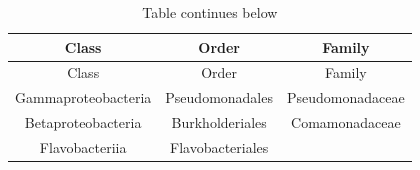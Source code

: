 \documentclass[]{article}
\begin{document}
\begin{longtable}[]{@{}ccc@{}}
\caption{Table continues below}\tabularnewline
\toprule
\begin{minipage}[b]{0.28\columnwidth}\centering\strut
Class\strut
\end{minipage} & \begin{minipage}[b]{0.25\columnwidth}\centering\strut
Order\strut
\end{minipage} & \begin{minipage}[b]{0.25\columnwidth}\centering\strut
Family\strut
\end{minipage}\tabularnewline
\midrule
\endfirsthead
\toprule
\begin{minipage}[b]{0.28\columnwidth}\centering\strut
Class\strut
\end{minipage} & \begin{minipage}[b]{0.25\columnwidth}\centering\strut
Order\strut
\end{minipage} & \begin{minipage}[b]{0.25\columnwidth}\centering\strut
Family\strut
\end{minipage}\tabularnewline
\midrule
\endhead
\begin{minipage}[t]{0.28\columnwidth}\centering\strut
Gammaproteobacteria\strut
\end{minipage} & \begin{minipage}[t]{0.25\columnwidth}\centering\strut
Pseudomonadales\strut
\end{minipage} & \begin{minipage}[t]{0.25\columnwidth}\centering\strut
Pseudomonadaceae\strut
\end{minipage}\tabularnewline
\begin{minipage}[t]{0.28\columnwidth}\centering\strut
Betaproteobacteria\strut
\end{minipage} & \begin{minipage}[t]{0.25\columnwidth}\centering\strut
Burkholderiales\strut
\end{minipage} & \begin{minipage}[t]{0.25\columnwidth}\centering\strut
Comamonadaceae\strut
\end{minipage}\tabularnewline
\begin{minipage}[t]{0.28\columnwidth}\centering\strut
Flavobacteriia\strut
\end{minipage} & \begin{minipage}[t]{0.25\columnwidth}\centering\strut
Flavobacteriales\strut
\end{minipage} & \begin{minipage}[t]{0.25\columnwidth}\centering\strut

\end{minipage}
\end{longtable}
\end{document}
